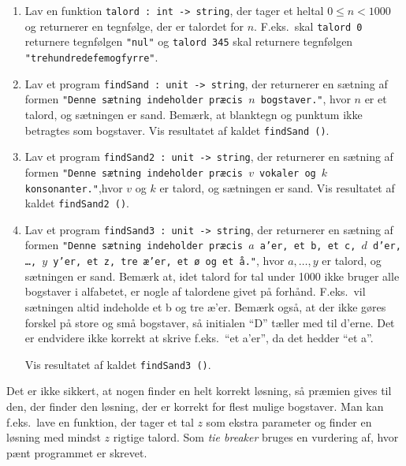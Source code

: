\documentclass[a4paper,12pt]{article}
\begin{document}
\begin{enumerate}[{2}N1]

\item Lav en funktion \texttt{talord : int -> string}, der tager et
  heltal $0 \leq n < 1000$ og returnerer en tegnfølge, der er talordet
  for $n$.  F.eks.\ skal \texttt{talord 0} returnere tegnfølgen
  \texttt{"nul"} og \texttt{talord 345} skal returnere tegnfølgen
  \texttt{"trehundredefemogfyrre"}.

\item Lav et program \texttt{findSand : unit -> string}, der
  returnerer en sætning af formen \texttt{"Denne sætning indeholder
    præcis $n$ bogstaver."}, hvor $n$ er et talord, og sætningen er
  sand.  Bemærk, at blanktegn og punktum ikke betragtes som bogstaver.
  Vis resultatet af kaldet \texttt{findSand ()}.

\item Lav et program \texttt{findSand2 : unit -> string}, der
  returnerer en sætning af formen \texttt{"Denne sætning indeholder
    præcis $v$ vokaler og $k$ konsonanter."},\newline hvor $v$ og $k$ er
  talord, og sætningen er sand. Vis resultatet af kaldet
  \texttt{findSand2\,()}.

\item Lav et program \texttt{findSand3 : unit -> string}, der
  returnerer en sætning af formen \texttt{"Denne sætning indeholder
    præcis $a$ a'er, et b, et c, $d$ d'er, \ldots, $y$ y'er, et z, tre
    æ'er, et ø og et å."}, hvor $a, \ldots, y$ er talord, og sætningen
  er sand.  Bemærk at, idet talord for tal under 1000 ikke bruger
  alle bogstaver i alfabetet, er nogle af talordene givet på forhånd.
  F.eks.\ vil sætningen altid indeholde et b og tre æ'er.  Bemærk
  også, at der ikke gøres forskel på store og små bogstaver, så
  initialen ``D'' tæller med til d'erne.  Det er endvidere ikke
  korrekt at skrive f.eks.\ ``et a'er'', da det hedder ``et a''.

  Vis resultatet af kaldet \texttt{findSand3 ()}.

\end{enumerate}

Det er ikke sikkert, at nogen finder en helt korrekt løsning, så
præmien gives til den, der finder den løsning, der er korrekt for
flest mulige bogstaver.  Man kan f.eks.\ lave en funktion, der tager
et tal $z$ som ekstra parameter og finder en løsning med mindst $z$
rigtige talord.  Som \emph{tie breaker} bruges en vurdering af, hvor
pænt programmet er skrevet.
\end{document}
